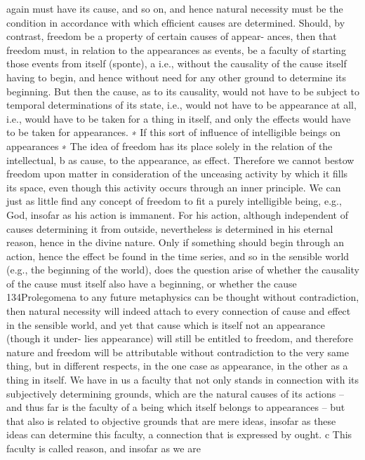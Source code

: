 again must have its cause, and so on, and hence natural necessity must be
the condition in accordance with which efﬁcient causes are determined.
Should, by contrast, freedom be a property of certain causes of appear-
ances, then that freedom must, in relation to the appearances as events,
be a faculty of starting those events from itself (sponte), a i.e., without the
causality of the cause itself having to begin, and hence without need for
any other ground to determine its beginning. But then the cause, as to its
causality, would not have to be subject to temporal determinations of its
state, i.e., would not have to be appearance at all, i.e., would have to be
taken for a thing in itself, and only the effects would have to be taken for
appearances. ∗ If this sort of inﬂuence of intelligible beings on appearances
∗
The idea of freedom has its place solely in the relation of the intellectual, b as
cause, to the appearance, as effect. Therefore we cannot bestow freedom upon
matter in consideration of the unceasing activity by which it ﬁlls its space,
even though this activity occurs through an inner principle. We can just as
little ﬁnd any concept of freedom to ﬁt a purely intelligible being, e.g., God,
insofar as his action is immanent. For his action, although independent of
causes determining it from outside, nevertheless is determined in his eternal
reason, hence in the divine nature. Only if something should begin through an
action, hence the effect be found in the time series, and so in the sensible
world (e.g., the beginning of the world), does the question arise of whether the
causality of the cause must itself also have a beginning, or whether the cause
134Prolegomena to any future metaphysics
can be thought without contradiction, then natural necessity will indeed
attach to every connection of cause and effect in the sensible world,
and yet that cause which is itself not an appearance (though it under-
lies appearance) will still be entitled to freedom, and therefore nature
and freedom will be attributable without contradiction to the very same
thing, but in different respects, in the one case as appearance, in the
other as a thing in itself.
We have in us a faculty that not only stands in connection with its
subjectively determining grounds, which are the natural causes of its
actions – and thus far is the faculty of a being which itself belongs to
appearances – but that also is related to objective grounds that are mere
ideas, insofar as these ideas can determine this faculty, a connection that
is expressed by ought. c This faculty is called reason, and insofar as we are
